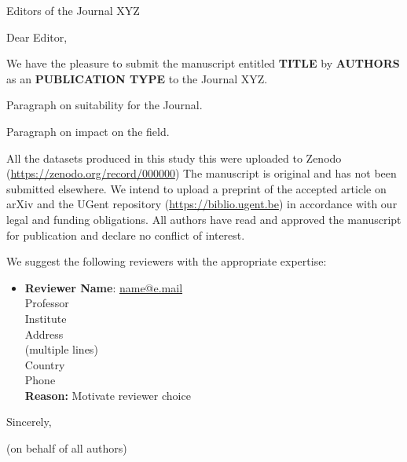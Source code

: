 \documentclass[faculty=we,rightcolwidth=.38,signature,pagenumbers]{ugent-letter}
\begin{document}
\mydate{\today}
\mysubject{}

\begin{letter}{
Editors of the Journal XYZ
}

\opening{Dear Editor,}

We have the pleasure to submit the manuscript entitled
\textbf{TITLE}
by \textbf{AUTHORS} as an \textbf{PUBLICATION TYPE} to the Journal XYZ.

Paragraph on suitability for the Journal.

Paragraph on impact on the field.

All the datasets produced in this study this were uploaded to Zenodo (\url{https://zenodo.org/record/000000}) The manuscript is original and has not been submitted elsewhere.
We intend to upload a preprint of the accepted article on arXiv and the UGent repository (\url{https://biblio.ugent.be}) in accordance with our legal and funding obligations.
All authors have read and approved the manuscript for publication and declare no conflict of interest.

We suggest the following reviewers with the appropriate expertise:
%
\begin{itemize}[itemsep=12pt]
    \item
    \begin{minipage}[t]{\linewidth}
    \textbf{Reviewer Name}: \href{mailto:name@e.mail}{name@e.mail} \\
    Professor \\
    Institute \\
    Address \\
    (multiple lines) \\
    Country \\
    Phone \\
    \textbf{Reason:} Motivate reviewer choice
    \end{minipage}
\end{itemize}

\closing{Sincerely,}
(on behalf of all authors)

\end{letter}
\end{document}
